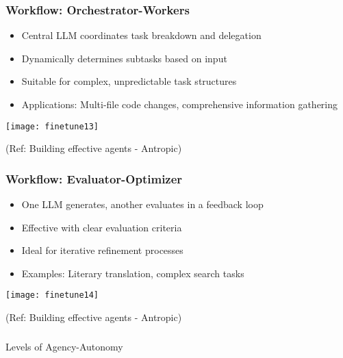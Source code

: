 \begin{frame}[fragile]\frametitle{Workflow: Orchestrator-Workers}
    \begin{itemize}
        \item Central LLM coordinates task breakdown and delegation
        \item Dynamically determines subtasks based on input
        \item Suitable for complex, unpredictable task structures
        \item Applications: Multi-file code changes, comprehensive information gathering
    \end{itemize}
	
	\begin{center}
	\texttt{[image: finetune13]}
	\end{center}

	{\tiny (Ref: Building effective agents - Antropic)}			
\end{frame}

\begin{frame}[fragile]\frametitle{Workflow: Evaluator-Optimizer}
    \begin{itemize}
        \item One LLM generates, another evaluates in a feedback loop
        \item Effective with clear evaluation criteria
        \item Ideal for iterative refinement processes
        \item Examples: Literary translation, complex search tasks
    \end{itemize}
	
	\begin{center}
	\texttt{[image: finetune14]}
	\end{center}

	{\tiny (Ref: Building effective agents - Antropic)}		
\end{frame}


\begin{frame}[fragile]\frametitle{}
\begin{center}
{\Large Levels of Agency-Autonomy}
\end{center}
\end{frame}

